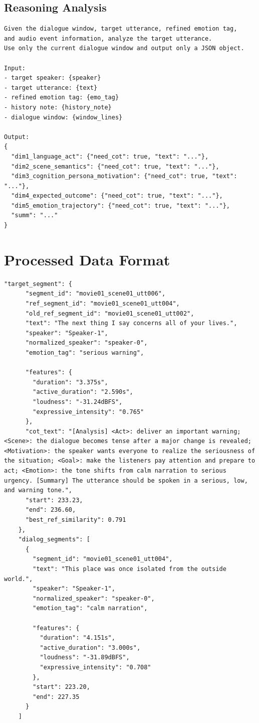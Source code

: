 \documentclass[a4paper]{article}
\begin{document}
\subsection{Reasoning Analysis}

\begin{lstlisting}[style=jsonstyle]
Given the dialogue window, target utterance, refined emotion tag,
and audio event information, analyze the target utterance.
Use only the current dialogue window and output only a JSON object.

Input:
- target speaker: {speaker}
- target utterance: {text}
- refined emotion tag: {emo_tag}
- history note: {history_note}
- dialogue window: {window_lines}

Output:
{
  "dim1_language_act": {"need_cot": true, "text": "..."},
  "dim2_scene_semantics": {"need_cot": true, "text": "..."},
  "dim3_cognition_persona_motivation": {"need_cot": true, "text": "..."},
  "dim4_expected_outcome": {"need_cot": true, "text": "..."},
  "dim5_emotion_trajectory": {"need_cot": true, "text": "..."},
  "summ": "..."
}
\end{lstlisting}




\section{Processed Data Format}
\label{app:initial_data_format}

\begin{lstlisting}[style=jsonstyle]
    "target_segment": {
      "segment_id": "movie01_scene01_utt006",
      "ref_segment_id": "movie01_scene01_utt004",
      "old_ref_segment_id": "movie01_scene01_utt002",
      "text": "The next thing I say concerns all of your lives.",
      "speaker": "Speaker-1",
      "normalized_speaker": "speaker-0",
      "emotion_tag": "serious warning",

      "features": {
        "duration": "3.375s",
        "active_duration": "2.590s",
        "loudness": "-31.24dBFS",
        "expressive_intensity": "0.765"
      },
      "cot_text": "[Analysis] <Act>: deliver an important warning; <Scene>: the dialogue becomes tense after a major change is revealed; <Motivation>: the speaker wants everyone to realize the seriousness of the situation; <Goal>: make the listeners pay attention and prepare to act; <Emotion>: the tone shifts from calm narration to serious urgency. [Summary] The utterance should be spoken in a serious, low, and warning tone.",
      "start": 233.23,
      "end": 236.60,
      "best_ref_similarity": 0.791
    },
    "dialog_segments": [
      {
        "segment_id": "movie01_scene01_utt004",
        "text": "This place was once isolated from the outside world.",
        "speaker": "Speaker-1",
        "normalized_speaker": "speaker-0",
        "emotion_tag": "calm narration",

        "features": {
          "duration": "4.151s",
          "active_duration": "3.000s",
          "loudness": "-31.89dBFS",
          "expressive_intensity": "0.708"
        },
        "start": 223.20,
        "end": 227.35
      }
    ]
\end{lstlisting}
\end{document}
